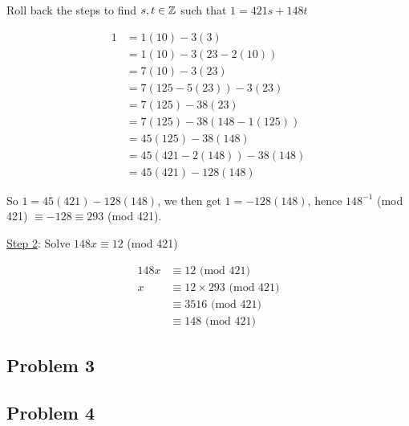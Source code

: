 \documentclass[10pt]{article}
\begin{document}
\spacing
\noindent
Roll back the steps to find $s, t \in \mathbb{Z}$ such that $1 = 421s + 148t$

\begin{align*}
  1 &= 1(10) - 3(3) \\
    &= 1(10) - 3(23 - 2(10)) \\
    &= 7(10) - 3(23) \\
    &= 7(125 - 5(23)) - 3(23) \\
    &= 7(125) - 38(23) \\
    &= 7(125) - 38(148 - 1(125)) \\
    &= 45(125) - 38(148) \\
    &= 45(421 - 2(148)) - 38(148) \\
    &= 45(421) - 128(148)
\end{align*}

\spacing
\noindent
So $1 = 45(421) - 128(148)$, we then get $1 = -128(148)$, 
hence $148^{-1}$ (mod 421) $\equiv -128 \equiv 293$ (mod 421).
\spacing

\noindent
\underline{Step 2}: Solve $148x \equiv 12$ (mod 421)

\begin{align*}
  148x &\equiv 12 \text{ (mod 421)} \\
     x &\equiv 12 \times 293 \text{ (mod 421)} \\
       &\equiv 3516 \text{ (mod 421)} \\
       &\equiv 148 \text{ (mod 421)}
\end{align*}

\newpage
\subsection*{Problem 3}

\newpage
\subsection*{Problem 4}
\end{document}
